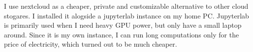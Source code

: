 \documentclass[11pt,a4paper]{altacv}
\begin{document}
	\divider
	
	
	\divider
	
	
	I use nextcloud as a cheaper, private and customizable alternative to other cloud stogares. I installed it alogside a jupyterlab instance on my home PC. Jupyterlab is primarily used when I need heavy GPU power, but only have a small laptop around. Since it is my own instance, I can run long computations only for the price of electricity, which turned out to be much cheaper.	
	
	\clearpage
	
	
\end{document}
